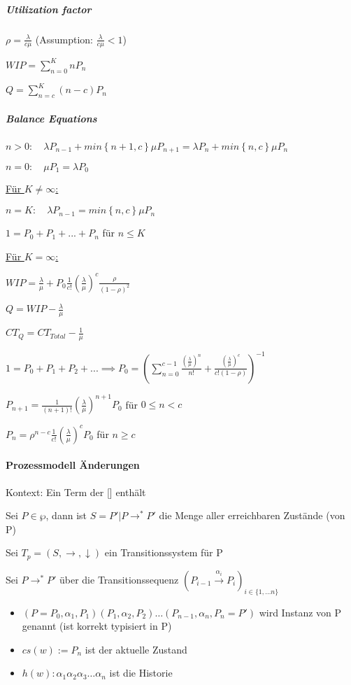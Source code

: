 \documentclass[a4paper,12pt,smallheadings]{scrartcl}
\begin{document}
\subparagraph{Utilization factor} 
$\rho = \frac{\lambda}{c\mu}$ 
\quad (Assumption: $\frac{\lambda}{c\mu} < 1$)

$WIP = \sum_{n=0}^{K} n P_n$

$Q = \sum_{n=c}^{K} (n-c) P_n$

\subparagraph{Balance Equations} \hfill

$n > 0: \quad \lambda P_{n-1} + min\left\{n+1,c\right\}\mu P_{n+1} = \lambda P_n + min\left\{ n, c \right\} \mu P_n $

$n = 0: \quad \mu P_1 = \lambda P_0$

\hfill

\underline{Für $K \neq \infty$:}

$n = K: \quad \lambda P_{n-1} = min\left\{ n,c \right\} \mu P_{n} $

$ 1 = P_0 + P_1 + ... + P_n $  \quad für $ n \leq K$

\hfill

\underline{Für $K = \infty$:}

$WIP = \frac{\lambda}{\mu} + P_0 \frac{1}{c!} \left(\frac{\lambda}{\mu}\right)^c \frac{\rho}{\left(1-\rho\right)^2}$

$Q = WIP - \frac{\lambda}{\mu}$

$CT_Q = CT_{Total} - \frac{1}{\mu}$

$1 = P_0 + P_1 + P_2 +... \implies P_0 = \left( \sum_{n=0}^{c-1} \frac{\left(\frac{\lambda}{\mu}\right)^n}{n!} +
\frac{ \left(\frac{\lambda}{\mu}\right)^c}{c! \left(1-\rho\right)} \right)^{-1}$

$P_{n+1} = \frac{1}{\left(n+1\right)!} \left(\frac{\lambda}{\mu}\right)^{n+1}P_0$ \quad für $0 \leq n < c$

$P_n = \rho^{n-c} \frac{1}{c!} \left(\frac{\lambda}{\mu}\right)^c P_0$ \quad für $ n \geq c$

\paragraph{Prozessmodell Änderungen} 
Kontext: Ein Term der [] enthält

Sei $P \in \wp$, dann ist $S = {P' | P \rightarrow^* P'}$ die Menge aller erreichbaren Zustände (von P)

Sei $T_p = (S , \rightarrow, \downarrow)$ ein Transitionssystem für P

Sei $P \rightarrow^* P'$ über die Transitionssequenz $(P_{i-1} \overset{\alpha_i}{\rightarrow} P_i)_{i \in \{1, \dots n\}}$
\begin{itemize}
\item $(P = P_0, \alpha_1, P_1)(P_1, \alpha_2, P_2) \dots (P_{n-1}, \alpha_n, P_n = P')$ wird Instanz von P genannt (ist korrekt typisiert in P)
\item $cs(w) := P_n$ ist der aktuelle Zustand
\item $h(w): \alpha_1\alpha_2\alpha_3 \dots \alpha_n$ ist die Historie
\end{itemize}
\end{document}
